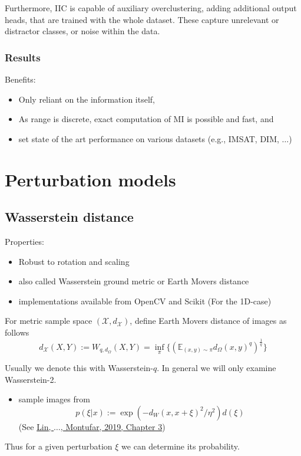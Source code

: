 \documentclass[]{article}
\begin{document}
Furthermore, IIC is capable of auxiliary overclustering, adding additional output heads, that are trained with the whole dataset. These capture unrelevant or distractor classes, or noise within the data.\\

\subsubsection{Results}
Benefits:
\begin{itemize}
	\item Only reliant on the information itself,
	\item As range is discrete, exact computation of MI is possible and fast, and 
	\item set state of the art performance on various datasets (e.g., IMSAT, DIM, $\dots$)
\end{itemize}

\section{Perturbation models}
\subsection{Wasserstein distance}

Properties:
\begin{itemize}
	\item Robust to rotation and scaling
	\item also called Wasserstein ground metric or Earth Movers distance
	\item implementations available from OpenCV and Scikit (For the 1D-case)
\end{itemize}

For metric sample space $(\mathcal{X},d_\mathcal{X})$, define Earth Movers distance of images as follows\\

\begin{equation}
	d_\mathcal{X}(X,Y):= W_{q,d_\Omega}(X,Y) = \inf_\pi \{ (\mathbb{E}_{(x,y)\sim \pi}d_\Omega (x,y)^q)^{\frac{1}{q}} \}
\end{equation} 

Usually we denote this with Wasserstein-$q$. In general we will only examine Wasserstein-2.

\begin{itemize}
	\item sample images from 
	\begin{equation}
		p(\xi|x):= \exp(-d_W(x,x+\xi)^2/\eta^2)d(\xi)
	\end{equation}(See \href{https://arxiv.org/pdf/1909.06860.pdf}{Lin, $\dots$, Montufar, 2019, Chapter 3})
\end{itemize}
Thus for a given perturbation $\xi$ we can determine its probability. 
\end{document}
